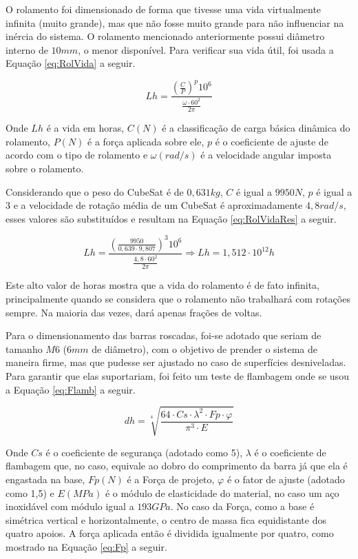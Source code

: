 \documentclass[
	12pt,				%
	openany,			%
	twoside,			%
	a4paper,			%
	english,			%
	french,				%
	spanish,			%
	brazil,				%
	oldfontcommands
	]{abntex2}
\begin{document}
O rolamento foi dimensionado de forma que tivesse uma vida virtualmente infinita (muito grande), mas que não fosse muito grande para não influenciar na inércia do sistema. O rolamento mencionado anteriormente possui diâmetro interno de $10mm$, o menor disponível. Para verificar sua vida útil, foi usada a Equação \ref{eq:RolVida} a seguir.

\begin{equation}
Lh = \frac{ \left( \frac{C}{P} \right)^{p} 10^{6}}{\frac{\omega \cdot 60^{2}}{2 \pi}}
\label{eq:RolVida}
\end{equation}

Onde $Lh$ é a vida em horas, $C(N)$ é a classificação de carga básica dinâmica do rolamento, $P(N)$ é a força aplicada sobre ele, $p$ é o coeficiente de ajuste de acordo com o tipo de rolamento e $\omega(rad/s)$ é a velocidade angular imposta sobre o rolamento.

Considerando que o peso do CubeSat é de $0,631kg$, $C$ é igual a $9950N$, $p$ é igual a $3$ e a velocidade de rotação média de um CubeSat é aproximadamente $4,8rad/s$, esses valores são substituídos e resultam na Equação \ref{eq:RolVidaRes} a seguir.

\begin{equation}
Lh = \frac{ \left( \frac{9950}{0,639 \cdot 9,807 } \right)^{3} 10^{6}}{\frac{4,8 \cdot 60^{2}}{2 \pi}} \Longrightarrow Lh = 1,512 \cdot 10^{12} h
\label{eq:RolVidaRes}
\end{equation}

Este alto valor de horas mostra que a vida do rolamento é de fato infinita, principalmente quando se considera que o rolamento não trabalhará com rotações sempre. Na maioria das vezes, dará apenas frações de voltas.

Para o dimensionamento das barras roscadas, foi-se adotado que seriam de tamanho $M6$ ($6mm$ de diâmetro), com o objetivo de prender o sistema de maneira firme, mas que pudesse ser ajustado no caso de superfícies desniveladas. Para garantir que elas suportariam, foi feito um teste de flambagem onde se usou a Equação \ref{eq:Flamb} a seguir.

\begin{equation}
dh = \sqrt[4]{ \frac{64 \cdot Cs \cdot \lambda^{2} \cdot Fp \cdot \varphi }{ \pi^{3} \cdot E } }
\label{eq:Flamb}
\end{equation}

Onde $Cs$ é o coeficiente de segurança (adotado como 5), $\lambda$ é o coeficiente de flambagem que, no caso, equivale ao dobro do comprimento da barra já que ela é engastada na base, $Fp(N)$ é a Força de projeto, $\varphi$ é o fator de ajuste (adotado como 1,5) e $E(MPa)$ é o módulo de elasticidade do material, no caso um aço inoxidável com módulo igual a $193GPa$. No caso da Força, como a base é simétrica vertical e horizontalmente, o centro de massa fica equidistante dos quatro apoios. A força aplicada então é dividida igualmente por quatro, como mostrado na Equação \ref{eq:Fp} a seguir.
\end{document}
